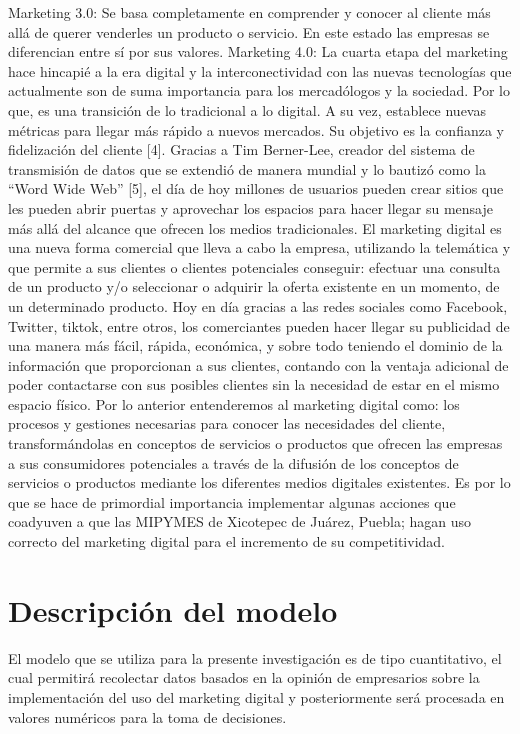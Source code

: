 \documentclass[12pt]{difu100cia} %
\begin{document}
Marketing 3.0: Se basa completamente en comprender y conocer al cliente más allá de querer venderles un producto o servicio. En este estado las empresas se diferencian entre sí por sus valores. 
Marketing 4.0: La cuarta etapa del marketing hace hincapié a la era digital y la interconectividad con las nuevas tecnologías que actualmente son de suma importancia para los mercadólogos y la sociedad. Por lo que, es una transición de lo tradicional a lo digital. A su vez, establece nuevas métricas para llegar más rápido a nuevos mercados. Su objetivo es la confianza y fidelización del cliente [4].
Gracias a Tim Berner-Lee, creador del sistema de transmisión de datos que se extendió de manera mundial y lo bautizó como la “Word Wide Web” [5], el día de hoy millones de usuarios pueden crear sitios que les pueden abrir puertas y aprovechar los espacios para hacer llegar su mensaje más allá del alcance que ofrecen los medios tradicionales. 
El marketing digital es una nueva forma comercial que lleva a cabo la empresa, utilizando la telemática y que permite a sus clientes o clientes potenciales conseguir: efectuar una consulta de un producto y/o seleccionar o adquirir la oferta existente en un momento, de un determinado producto. 
Hoy en día gracias a las redes sociales como Facebook, Twitter, tiktok, entre otros, los comerciantes pueden hacer llegar su publicidad de una manera más fácil, rápida, económica, y sobre todo teniendo el dominio de la información que proporcionan a sus clientes, contando con la ventaja adicional de poder contactarse con sus posibles clientes sin la necesidad de estar en el mismo espacio físico. 
Por lo anterior entenderemos al marketing digital como: los procesos y gestiones necesarias para conocer las necesidades del cliente, transformándolas en conceptos de servicios o productos que ofrecen las empresas a sus consumidores potenciales a través de la difusión de los conceptos de servicios o productos mediante los diferentes medios digitales existentes. Es por lo que se hace de primordial importancia implementar algunas acciones que coadyuven a que las MIPYMES de Xicotepec de Juárez, Puebla; hagan uso correcto del marketing digital para el incremento de su competitividad.

\section{Descripción del modelo}
\label{Descripcion del modelo}

El modelo que se utiliza para la presente investigación es de tipo cuantitativo, el cual permitirá recolectar datos basados en la opinión de empresarios sobre la implementación del uso del marketing digital y posteriormente será procesada en valores numéricos para la toma de decisiones. 
\end{document}
